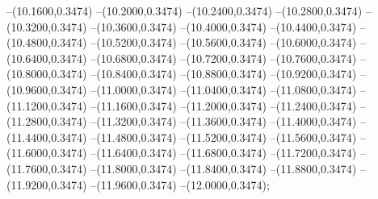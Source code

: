 {	--(10.1600,0.3474)
	--(10.2000,0.3474)
	--(10.2400,0.3474)
	--(10.2800,0.3474)
	--(10.3200,0.3474)
	--(10.3600,0.3474)
	--(10.4000,0.3474)
	--(10.4400,0.3474)
	--(10.4800,0.3474)
	--(10.5200,0.3474)
	--(10.5600,0.3474)
	--(10.6000,0.3474)
	--(10.6400,0.3474)
	--(10.6800,0.3474)
	--(10.7200,0.3474)
	--(10.7600,0.3474)
	--(10.8000,0.3474)
	--(10.8400,0.3474)
	--(10.8800,0.3474)
	--(10.9200,0.3474)
	--(10.9600,0.3474)
	--(11.0000,0.3474)
	--(11.0400,0.3474)
	--(11.0800,0.3474)
	--(11.1200,0.3474)
	--(11.1600,0.3474)
	--(11.2000,0.3474)
	--(11.2400,0.3474)
	--(11.2800,0.3474)
	--(11.3200,0.3474)
	--(11.3600,0.3474)
	--(11.4000,0.3474)
	--(11.4400,0.3474)
	--(11.4800,0.3474)
	--(11.5200,0.3474)
	--(11.5600,0.3474)
	--(11.6000,0.3474)
	--(11.6400,0.3474)
	--(11.6800,0.3474)
	--(11.7200,0.3474)
	--(11.7600,0.3474)
	--(11.8000,0.3474)
	--(11.8400,0.3474)
	--(11.8800,0.3474)
	--(11.9200,0.3474)
	--(11.9600,0.3474)
	--(12.0000,0.3474);
}

